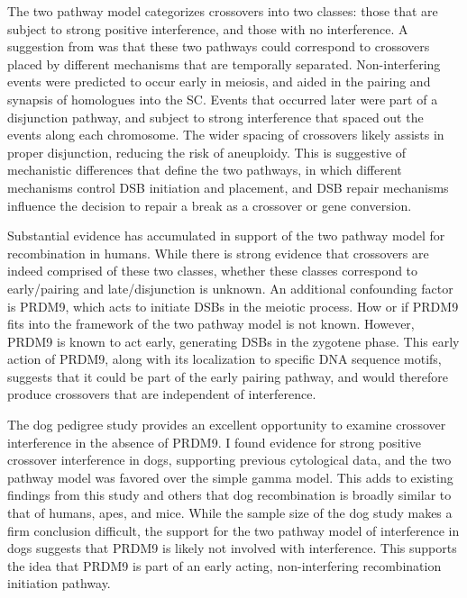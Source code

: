 The two pathway model categorizes crossovers into two classes: those that are subject to strong positive interference, and those with no interference.
A suggestion from \citet{Housworth2003} was that these two pathways could correspond to crossovers placed by different mechanisms that are temporally separated.
Non-interfering events were predicted to occur early in meiosis, and aided in the pairing and synapsis of homologues into the SC.
Events that occurred later were part of a disjunction pathway, and subject to strong interference that spaced out the events along each chromosome.
The wider spacing of crossovers likely assists in proper disjunction, reducing the risk of aneuploidy.
This is suggestive of mechanistic differences that define the two pathways, in which different mechanisms
control DSB initiation and placement, and DSB repair mechanisms influence the decision to repair a break as a crossover or gene conversion\cite{Baudat2007,Berchowitz2010,Stahl2010}.

Substantial evidence has accumulated in support of the two pathway model for recombination in humans\cite{Housworth2003,Fledel-Alon2009,Campbell2015}.
While there is strong evidence that crossovers are indeed comprised of these two classes, whether these classes correspond to early/pairing and late/disjunction is unknown.
An additional confounding factor is PRDM9, which acts to initiate DSBs in the meiotic process.
How or if PRDM9 fits into the framework of the two pathway model is not known.
However, PRDM9 is known to act early, generating DSBs in the zygotene phase\cite{Hayashi2005}.
This early action of PRDM9, along with its localization to specific DNA sequence motifs, suggests that it could be part of the early pairing pathway, and would therefore produce crossovers that are independent of interference.

The dog pedigree study provides an excellent opportunity to examine crossover interference in the absence of PRDM9.
I found evidence for strong positive crossover interference in dogs, supporting previous cytological data\cite{Basheva2008}, and the two pathway model was favored over the simple gamma model.
This adds to existing findings from this study and others\cite{Axelsson2012,Auton2013,Wong2010} that dog recombination is broadly similar to that of humans, apes, and mice.
While the sample size of the dog study makes a firm conclusion difficult, 
the support for the two pathway model of interference in dogs suggests that PRDM9 is likely not involved with interference.
This supports the idea that PRDM9 is part of an early acting, non-interfering recombination initiation pathway.



